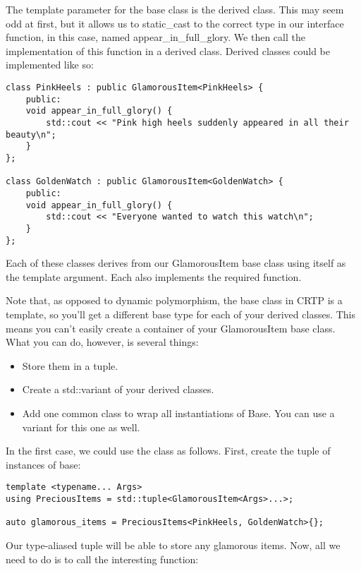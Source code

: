 The template parameter for the base class is the derived class. This may seem odd at first, but it allows us to static\_cast to the correct type in our interface function, in this case, named appear\_in\_full\_glory. We then call the implementation of this function in a derived class. Derived classes could be implemented like so:

\begin{lstlisting}[style=styleCXX]
class PinkHeels : public GlamorousItem<PinkHeels> {
	public:
	void appear_in_full_glory() {
		std::cout << "Pink high heels suddenly appeared in all their beauty\n";
	}
};

class GoldenWatch : public GlamorousItem<GoldenWatch> {
	public:
	void appear_in_full_glory() {
		std::cout << "Everyone wanted to watch this watch\n";
	}
};
\end{lstlisting}

Each of these classes derives from our GlamorousItem base class using itself as the template argument. Each also implements the required function.

Note that, as opposed to dynamic polymorphism, the base class in CRTP is a template, so you'll get a different base type for each of your derived classes. This means you can't easily create a container of your GlamorousItem base class. What you can do, however, is several things:

\begin{itemize}
\item 
Store them in a tuple.

\item 
Create a std::variant of your derived classes.

\item 
Add one common class to wrap all instantiations of Base. You can use a variant for this one as well.
\end{itemize}

In the first case, we could use the class as follows. First, create the tuple of instances of base:

\begin{lstlisting}[style=styleCXX]
template <typename... Args>
using PreciousItems = std::tuple<GlamorousItem<Args>...>;

auto glamorous_items = PreciousItems<PinkHeels, GoldenWatch>{};
\end{lstlisting}

Our type-aliased tuple will be able to store any glamorous items. Now, all we need to do is to call the interesting function:

